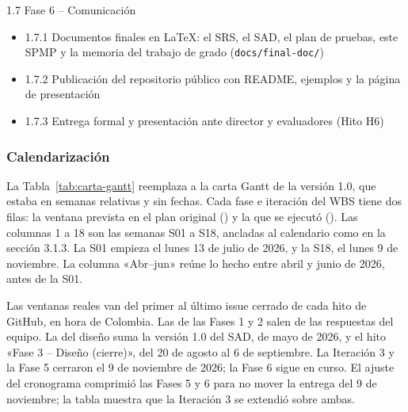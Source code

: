 1.7 Fase 6 – Comunicación

\begin{itemize}
  \item 1.7.1 Documentos finales en LaTeX: el SRS, el SAD, el plan de pruebas, este SPMP y la memoria del trabajo de grado (\texttt{docs/final-doc/})
  \item 1.7.2 Publicación del repositorio público con README, ejemplos y la página de presentación
  \item 1.7.3 Entrega formal y presentación ante director y evaluadores (Hito H6)
\end{itemize}

\subsubsection{Calendarización}

La Tabla~\ref{tab:carta-gantt} reemplaza a la carta Gantt de la versión 1.0, que estaba en semanas relativas y sin fechas. Cada fase e iteración del WBS tiene dos filas: la ventana prevista en el plan original (\GPlan) y la que se ejecutó (\GReal). Las columnas 1 a 18 son las semanas S01 a S18, ancladas al calendario como en la sección 3.1.3. La S01 empieza el lunes 13 de julio de 2026, y la S18, el lunes 9 de noviembre. La columna «Abr--jun» reúne lo hecho entre abril y junio de 2026, antes de la S01.

Las ventanas reales van del primer al último issue cerrado de cada hito de GitHub, en hora de Colombia. Las de las Fases 1 y 2 salen de las respuestas del equipo. La del diseño suma la versión 1.0 del SAD, de mayo de 2026, y el hito «Fase 3 -- Diseño (cierre)», del 20 de agosto al 6 de septiembre. La Iteración 3 y la Fase 5 cerraron el 9 de noviembre de 2026; la Fase 6 sigue en curso. El ajuste del cronograma comprimió las Fases 5 y 6 para no mover la entrega del 9 de noviembre; la tabla muestra que la Iteración 3 se extendió sobre ambas.

